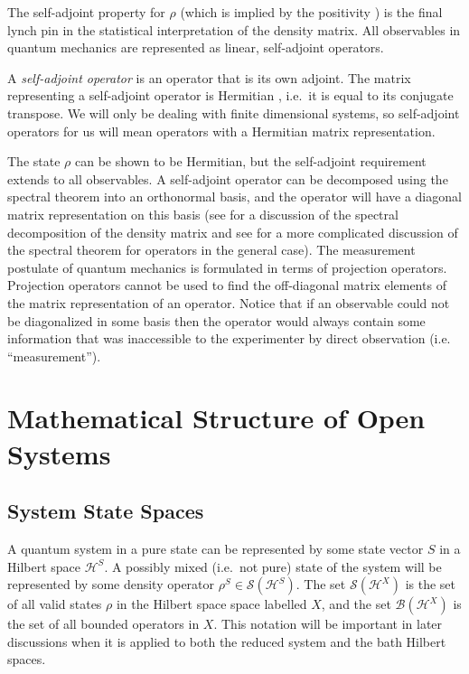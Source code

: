 The self-adjoint property for $\rho$ (which is implied by the positivity \cite{Eidelman2004}) is the final lynch pin in the statistical interpretation of the density matrix.  All observables in quantum mechanics are represented as linear, self-adjoint operators.  
\begin{definition}
A {\em self-adjoint operator} is an operator that is its own adjoint.  The matrix representing a self-adjoint operator is Hermitian \cite{Byron1992}, i.e.\ it is equal to its conjugate transpose.  We will only be dealing with finite dimensional systems, so self-adjoint operators for us will mean operators with a Hermitian matrix representation.
\end{definition}
The state $\rho$ can be shown to be Hermitian, but the self-adjoint requirement extends to all observables.  A self-adjoint operator can be decomposed using the spectral theorem into an orthonormal basis, and the operator will have a diagonal matrix representation on this basis (see \cite{Nielsen2010} for a discussion of the spectral decomposition of the density matrix and see \cite{Breuer2007} for a more complicated discussion of the spectral theorem for operators in the general case).  The measurement postulate of quantum mechanics is formulated in terms of projection operators.  Projection operators cannot be used to find the off-diagonal matrix elements of the matrix representation of an operator.  Notice that if an observable could not be diagonalized in some basis then the operator would always contain some information that was inaccessible to the experimenter by direct observation (i.e. ``measurement'').

\section{Mathematical Structure of Open Systems}

\subsection{System State Spaces}
A quantum system in a pure state can be represented by some state vector $S$ in a Hilbert space $\mathcal{H}^S$.  A possibly mixed (i.e.\ not pure) state of the system will be represented by some density operator $\rho^S\in \mathcal{S}(\mathcal{H}^S)$.  The set $\mathcal{S}(\mathcal{H}^X)$ is the set of all valid states $\rho$ in the Hilbert space space labelled $X$, and the set $\mathcal{B}(\mathcal{H}^X)$ is the set of all bounded operators in $X$.  This notation will be important in later discussions when it is applied to both the reduced system and the bath Hilbert spaces.

